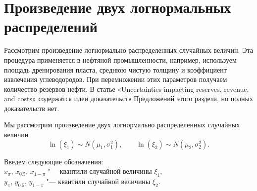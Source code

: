 \documentclass[specialist, substylefile = spbu.rtx,
subf,href,colorlinks=true, 12pt]{disser}
\begin{document}
	\chapter{Произведение двух логнормальных распределений}

	Рассмотрим произведение логнормально распределенных случайных величин. Эта процедура применяется в нефтяной промышленности, например, используем площадь дренирования пласта, среднюю чистую толщину и коэффициент извлечения углеводородов. При перемножении этих параметров получаем количество резервов нефти. В статье «Uncertainties impacting reserves, revenue, and costs» \cite{Uncertainties} содержатся идеи доказательств Предложений этого раздела, но полных доказательств нет.
	
	Мы рассмотрим произведение двух логнормально распределенных случайных величин 
	\begin{equation*}
		\ln(\xi_{1}) \sim N(\mu_{1}, \sigma _{1}^{2}), \quad\quad \ln(\xi_{2}) \sim N(\mu_{2}, \sigma _{2}^{2}).
	\end{equation*}
	
	Введем следующие обозначения:\\
	$x_{\pi}$, $x_{0.5}$, $x_{1-\pi}$ "--- квантили случайной величины $\xi_{1}$,\\
	$y_{\pi}$, $y_{0.5}$, $y_{1-\pi}$ "--- квантили случайной величины $\xi_{2}$.
	
\end{document}
